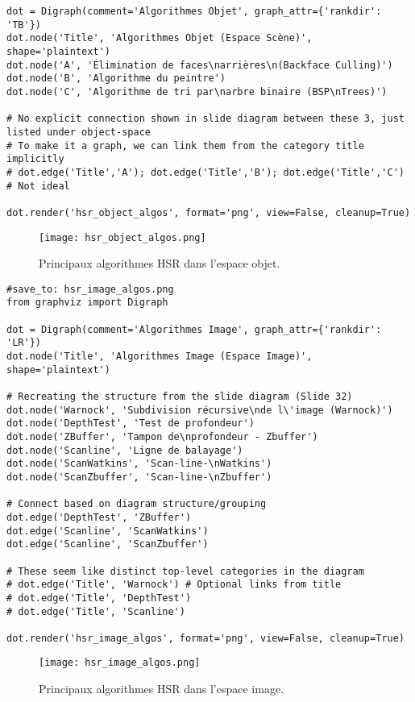 \documentclass{article}
\begin{document}
{\begin{verbatim}
dot = Digraph(comment='Algorithmes Objet', graph_attr={'rankdir': 'TB'})
dot.node('Title', 'Algorithmes Objet (Espace Scène)', shape='plaintext')
dot.node('A', 'Élimination de faces\narrières\n(Backface Culling)')
dot.node('B', 'Algorithme du peintre')
dot.node('C', 'Algorithme de tri par\narbre binaire (BSP\nTrees)')

# No explicit connection shown in slide diagram between these 3, just listed under object-space
# To make it a graph, we can link them from the category title implicitly
# dot.edge('Title','A'); dot.edge('Title','B'); dot.edge('Title','C') # Not ideal

dot.render('hsr_object_algos', format='png', view=False, cleanup=True)
\end{verbatim}

\begin{figure}[H]
\centering
\texttt{[image: hsr\_object\_algos.png]}
\caption{Principaux algorithmes HSR dans l'espace objet.}
\label{fig:hsr_object_algos}
\end{figure}

\begin{verbatim}
#save_to: hsr_image_algos.png
from graphviz import Digraph

dot = Digraph(comment='Algorithmes Image', graph_attr={'rankdir': 'LR'})
dot.node('Title', 'Algorithmes Image (Espace Image)', shape='plaintext')

# Recreating the structure from the slide diagram (Slide 32)
dot.node('Warnock', 'Subdivision récursive\nde l\'image (Warnock)')
dot.node('DepthTest', 'Test de profondeur')
dot.node('ZBuffer', 'Tampon de\nprofondeur - Zbuffer')
dot.node('Scanline', 'Ligne de balayage')
dot.node('ScanWatkins', 'Scan-line-\nWatkins')
dot.node('ScanZbuffer', 'Scan-line-\nZbuffer')

# Connect based on diagram structure/grouping
dot.edge('DepthTest', 'ZBuffer')
dot.edge('Scanline', 'ScanWatkins')
dot.edge('Scanline', 'ScanZbuffer')

# These seem like distinct top-level categories in the diagram
# dot.edge('Title', 'Warnock') # Optional links from title
# dot.edge('Title', 'DepthTest')
# dot.edge('Title', 'Scanline')

dot.render('hsr_image_algos', format='png', view=False, cleanup=True)
\end{verbatim}

\begin{figure}[H]
\centering
\texttt{[image: hsr\_image\_algos.png]}
\caption{Principaux algorithmes HSR dans l'espace image.}
\label{fig:hsr_image_algos}
\end{figure}

}
\end{document}
